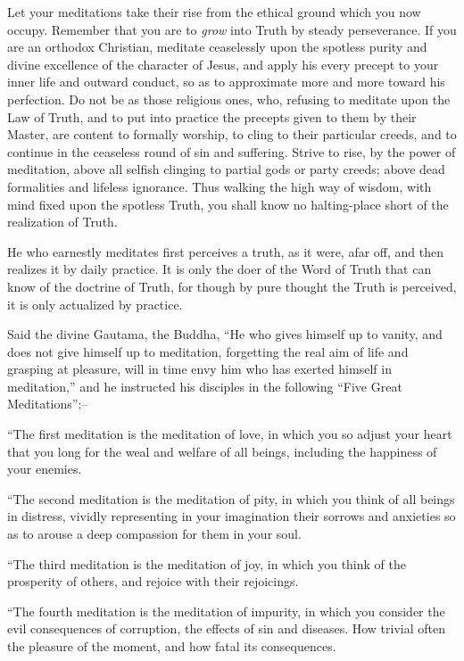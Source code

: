 \documentclass[12pt,oneside]{scrbook}
\begin{document}
  Let your meditations take their rise from the ethical ground which you
  now occupy. Remember that you are to \emph{grow} into Truth by steady
  perseverance. If you are an orthodox Christian, meditate ceaselessly
  upon the spotless purity and divine excellence of the character of
  Jesus, and apply his every precept to your inner life and outward
  conduct, so as to approximate more and more toward his perfection. Do
  not be as those religious ones, who, refusing to meditate upon the Law
  of Truth, and to put into practice the precepts given to them by their
  Master, are content to formally worship, to cling to their particular
  creeds, and to continue in the ceaseless round of sin and suffering.
  Strive to rise, by the power of meditation, above all selfish clinging
  to partial gods or party creeds; above dead formalities and lifeless
  ignorance. Thus walking the high way of wisdom, with mind fixed upon the
  spotless Truth, you shall know no halting-place short of the realization
  of Truth.
  
  He who earnestly meditates first perceives a truth, as it were, afar
  off, and then realizes it by daily practice. It is only the doer of the
  Word of Truth that can know of the doctrine of Truth, for though by pure
  thought the Truth is perceived, it is only actualized by practice.
  
  Said the divine Gautama, the Buddha, ``He who gives himself up to
  vanity, and does not give himself up to meditation, forgetting the real
  aim of life and grasping at pleasure, will in time envy him who has
  exerted himself in meditation,'' and he instructed his disciples in the
  following ``Five Great Meditations'':--
  
  ``The first meditation is the meditation of love, in which you so adjust
  your heart that you long for the weal and welfare of all beings,
  including the happiness of your enemies.
  
  ``The second meditation is the meditation of pity, in which you think of
  all beings in distress, vividly representing in your imagination their
  sorrows and anxieties so as to arouse a deep compassion for them in your
  soul.
  
  ``The third meditation is the meditation of joy, in which you think of
  the prosperity of others, and rejoice with their rejoicings.
  
  ``The fourth meditation is the meditation of impurity, in which you
  consider the evil consequences of corruption, the effects of sin and
  diseases. How trivial often the pleasure of the moment, and how fatal
  its consequences.
  
\end{document}
